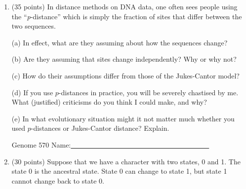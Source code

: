 \documentclass[12pt]{article}
\begin{document}
\begin{enumerate}
(b) Make a compatibility matrix for all of the characters.  Make clear
to me how you are indicating that two characters are compatible
(which symbol you are using).
\vfill


(c) Make a graph whose points are the 7 characters, with
points being connected when those two characters are compatible.
Number the points so I know which character corresponds to each
point.
\vfill

\newpage
\noindent
Genome 570 \hfill Name:\underline{~~~~~~~~~~~~~~~~~~~~~~~~~~~~~~~~~~~~~~~~}\\
\bigskip

(d) What is the largest clique?
\vfill


(e) What tree is indicated by the characters in that clique?
\vfill


(f) If we use that tree and have all characters change on it,
how many changes are needed in each character?
\vfill


(g) In effect, what parsimony method are you using when you count the
changes of state?
\vfill



\newpage
\noindent
Genome 570 \hfill Name:\underline{~~~~~~~~~~~~~~~~~~~~~~~~~~~~~~~~~~~~~~~~}\\
\medskip

\noindent
\item (35 points)  In distance methods on DNA data, one often sees
people using the ``{\it p}-distance'' which is simply the fraction
of sites that differ between the two sequences.  

(a) In effect, what are they assuming about how the sequences change?
\vfill

(b) Are they assuming that sites change independently? Why or why
not?
\vfill

(c) How do their assumptions differ from those of the Jukes-Cantor
model?
\vfill

(d) If you use $p$-distances in practice, you will be severely chastised by me.
What (justified) criticisms do you think I could make, and why?
\vfill

(e) In what evolutionary situation might it not matter much whether you used $p$-distances or
Jukes-Cantor distance?  Explain.
\vfill


\newpage
\noindent
Genome 570 \hfill Name:\underline{~~~~~~~~~~~~~~~~~~~~~~~~~~~~~~~~~~~~~~~~}\\
\medskip

\item (30 points)   Suppose that we have a character with two
states, 0 and 1.  The state 0 is the ancestral state.   State 0 can
change to state 1, but state 1 cannot change back to state 0.


\end{enumerate}
\end{document}
